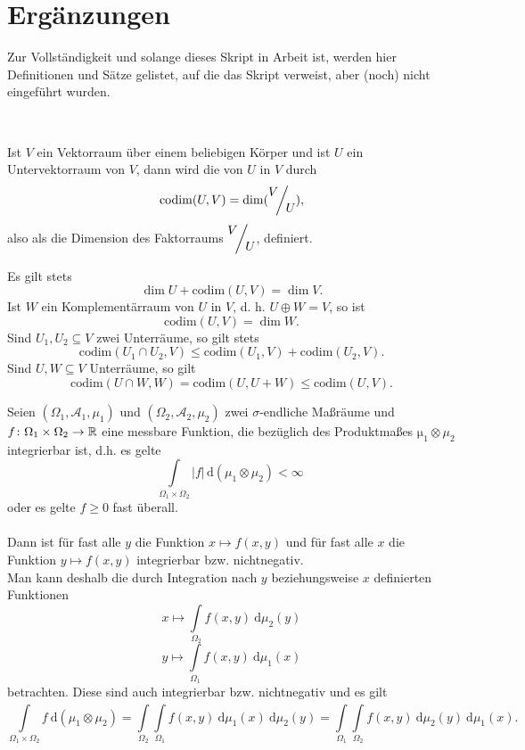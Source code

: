 

\section*{Ergänzungen} 


Zur Vollständigkeit und solange dieses Skript in Arbeit ist, werden hier Definitionen und Sätze gelistet, auf die das Skript verweist, aber (noch) nicht eingeführt wurden.

~

\begin{definition*}
	Ist $V$ ein Vektorraum über einem beliebigen Körper und ist $U$ ein Untervektorraum von $V$, dann wird die  von $U$ in $V$ durch
	\[ \mathrm{codim}(U,V) = \dim ( \QR{V}{U} ), \]
	also als die Dimension des Faktorraums $\QR{V}{U}$, definiert.
\end{definition*}

\begin{bemerkung*}
	Es gilt stets
		\[ \dim U+\mathrm{codim}(U,V)=\dim V. \]
	Ist $W$ ein Komplementärraum von $U$ in $V$, d. h. $U \oplus W = V$, so ist
		\[ \mathrm{codim}(U,V)=\dim W. \]
	Sind $U_1,U_2\subseteq V$ zwei Unterräume, so gilt stets
		\[ \mathrm{codim}(U_1\cap U_2,V)\leq\mathrm{codim}(U_1,V)+\mathrm{codim}(U_2,V). \]
	Sind $U,W\subseteq V$ Unterräume, so gilt
		\[ \mathrm{codim}(U\cap W,W)=\mathrm{codim}(U,U+W)\leq\mathrm{codim}(U,V). \]
\end{bemerkung*}


\begin{satz*}[Fubini]  \label{satz:x-SatzvonFubini}
	Seien $(\Omega_1, \mathcal{A}_1, \mu_1)$ und $(\Omega_2, \mathcal{A}_2, \mu_2)$ zwei $\sigma$-endliche Maßräume und $f \colon \Omega_1 \times \Omega_2 \rightarrow \mathbb{R}$ eine messbare Funktion, die bezüglich des Produktmaßes $\mathrm \mu_1 \otimes \mu_2$ integrierbar ist, d.h. es gelte
		\[ \int\limits_{\Omega_1 \times \Omega_2} |f| \, \mathrm d(\mu_1 \otimes \mu_2) < \infty \ \]
	oder es gelte $f \geq 0$ fast überall. \\ \\
	Dann ist für fast alle $y$ die Funktion $ x \mapsto f(x,y)$ und für fast alle $x$ die Funktion $y \mapsto f(x,y)$ integrierbar bzw. nichtnegativ. \\
	Man kann deshalb die durch Integration nach $y$ beziehungsweise $x$ definierten Funktionen
		\[  x \mapsto  \int\limits_{\Omega_2} f(x,y) ~ \mathrm d\mu_2(y)  \]
		\[ y \mapsto  \int\limits_{\Omega_1} f(x,y) ~ \mathrm d\mu_1(x) \]
	betrachten. Diese sind auch integrierbar bzw. nichtnegativ und es gilt
		\[ \int\limits_{\Omega_1 \times \Omega_2} f ~ \mathrm d(\mu_1 \otimes \mu_2) = \int\limits_{\Omega_2}^{}\int\limits_{\Omega_1}^{}f(x,y)~ \mathrm d\mu_1(x)~ \mathrm d\mu_2(y) = \int\limits_{\Omega_1}^{}\int\limits_{\Omega_2}^{}f(x,y)~\mathrm d\mu_2(y)~ \mathrm d\mu_1(x). \]
\end{satz*}


